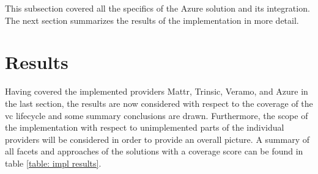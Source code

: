         This subsection covered all the specifics of the Azure solution and its integration. The next section summarizes the results of the implementation in more detail.
        \vfill
    
    \section{Results} %
    
     Having covered the implemented providers Mattr, Trinsic, Veramo, and Azure in the last section, the results are now considered with respect to the coverage of the \ac{vc} lifecycle and some summary conclusions are drawn. Furthermore, the scope of the implementation with respect to unimplemented parts of the individual providers will be considered in order to provide an overall picture. A summary of all facets and approaches of the solutions with a coverage score can be found in table \ref{table: impl results}.
     
